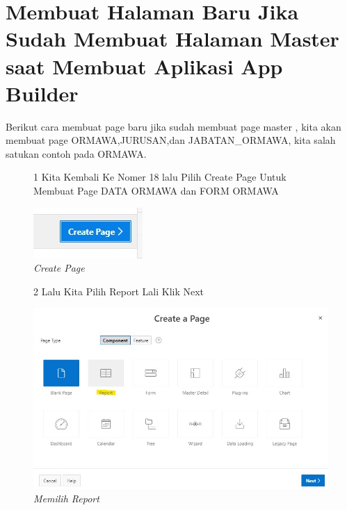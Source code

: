 \section{Membuat Halaman Baru Jika Sudah Membuat Halaman Master saat Membuat Aplikasi App Builder}
Berikut cara membuat page baru jika sudah membuat page master , kita akan membuat page ORMAWA,JURUSAN,dan JABATAN\_ORMAWA, kita salah satukan contoh pada ORMAWA.
        \begin{itemize}
        \begin{figure}
        \item[1]Kita Kembali Ke Nomer 18 lalu Pilih Create Page Untuk Membuat Page DATA ORMAWA dan FORM ORMAWA
        \begin{center}
        \includegraphics[scale=0.9]{figures/buat_page_baru.jpg}
        \caption{\textit{Create Page}}
        \end{center}
        \end{figure}
        
        \begin{figure}[!htbp]
        \item[2]Lalu Kita Pilih Report Lali Klik Next
        \begin{center}
        \includegraphics[scale=0.5]{figures/pilih_report.jpg}
        \caption{\textit{Memilih Report}}
        \end{center}
        \end{figure}
        

\end{itemize}
